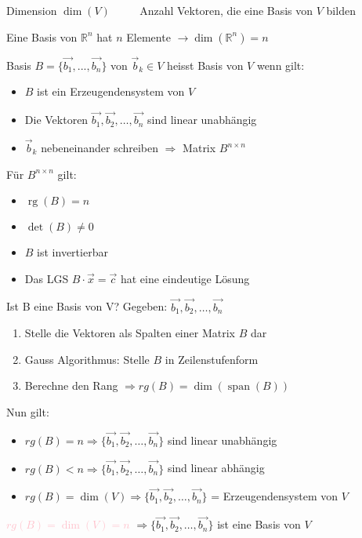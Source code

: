 \begin{definition}{Dimension} $\operatorname{dim}(V)$
    {\small $\quad \quad$ Anzahl Vektoren, die eine Basis von $V$ bilden}

    Eine Basis von $\mathbb{R}^{n}$ hat $n$ Elemente $\rightarrow \operatorname{dim}\left(\mathbb{R}^{n}\right)=n$
\end{definition}

\begin{definition}{Basis}
    $B=\{\vec{b_{1}}, ..., \vec{b_{n}}\}$ von $\vec{b}_{k} \in V$ heisst Basis von $V$ wenn gilt:
    \begin{itemize}
        \item $B$ ist ein Erzeugendensystem von $V$
        \item Die Vektoren $\overrightarrow{b_{1}}, \overrightarrow{b_{2}}, \ldots, \overrightarrow{b_{n}}$ sind linear unabhängig
        \item $\vec{b}_k$ nebeneinander schreiben $\Rightarrow$ Matrix $B^{n \times n}$
    \end{itemize}

    Für $B^{n \times n}$ gilt:
    \begin{itemize}
        \item $\operatorname{rg}(B)=n$
        \item $\operatorname{det}(B) \neq 0$
        \item $B$ ist invertierbar
        \item Das LGS $B \cdot \vec{x}=\vec{c}$ hat eine eindeutige Lösung
        \end{itemize}
\end{definition}

\begin{KR}{Ist B eine Basis von V?} 
    Gegeben: $\overrightarrow{b_{1}}, \overrightarrow{b_{2}}, \ldots, \overrightarrow{b_{n}}$
    \begin{enumerate}
        \item Stelle die Vektoren als Spalten einer Matrix $B$ dar
        \item Gauss Algorithmus: Stelle $B$ in Zeilenstufenform
        \item Berechne den Rang $\Rightarrow r g(B) = \operatorname{dim}(\operatorname{span}(B))$
    \end{enumerate}

    Nun gilt:
    \begin{itemize}
        \item $r g(B)=n \Rightarrow \{\vec{b_{1}}, \vec{b_{2}}, \ldots, \vec{b_{n}}\}$ sind linear unabhängig
        \item $r g(B)<n \Rightarrow \{\vec{b_{1}}, \vec{b_{2}}, \ldots, \vec{b_{n}}\}$ sind linear abhängig
        \item $r g(B)=\operatorname{dim}(V) \Rightarrow \{\vec{b_{1}}, \vec{b_{2}}, \ldots, \vec{b_{n}}\}$ = Erzeugendensystem von $V$
    \end{itemize}
    \begin{center}
    \textcolor{pink}{$r g(B)=\operatorname{dim}(V)=n$} $\Rightarrow \{\vec{b_{1}}, \vec{b_{2}}, \ldots, \vec{b_{n}}\}$ ist eine Basis von $V$
    \end{center}
\end{KR}

